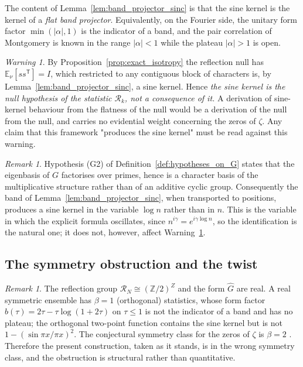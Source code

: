 \documentclass[11pt]{amsart}
\numberwithin{equation}{section}
\theoremstyle{plain}
\theoremstyle{definition}
\theoremstyle{remark}
\newtheorem{remark}[theorem]{Remark}
\newtheorem{warning}[theorem]{Warning}
\begin{document}
The content of Lemma~\ref{lem:band_projector_sinc} is that the sine
kernel is the kernel of a \emph{flat band projector}. Equivalently, on
the Fourier side, the unitary form factor $\min(|\alpha|,1)$ is the
indicator of a band, and the pair correlation of Montgomery
\cite{Montgomery1973} is known in the range $|\alpha| < 1$ while the
plateau $|\alpha| > 1$ is open.

\begin{warning}
\label{warn:sinc_is_the_null}
By Proposition~\ref{prop:exact_isotropy} the reflection null has
$\mathbb{E}_\nu[ss^{\mathsf{T}}] = I$, which restricted to any
contiguous block of characters is, by
Lemma~\ref{lem:band_projector_sinc}, a sine kernel. Hence
\emph{the sine kernel is the null hypothesis of the statistic
$\mathcal{R}_k$, not a consequence of it.} A derivation of sine-kernel
behaviour from the flatness of the null would be a derivation of the
null from the null, and carries no evidential weight concerning the
zeros of $\zeta$. Any claim that this framework "produces the sine
kernel" must be read against this warning.
\end{warning}

\begin{remark}
\label{rem:multiplicative_band}
Hypothesis (G2) of Definition~\ref{def:hypotheses_on_G} states that the
eigenbasis of $G$ factorises over primes, hence is a character basis of
the multiplicative structure rather than of an additive cyclic group.
Consequently the band of Lemma~\ref{lem:band_projector_sinc}, when
transported to positions, produces a sine kernel in the variable
$\log n$ rather than in $n$. This is the variable in which the explicit
formula oscillates, since $n^{i\gamma} = e^{i\gamma \log n}$, so the
identification is the natural one; it does not, however, affect
Warning~\ref{warn:sinc_is_the_null}.
\end{remark}

\subsection{The symmetry obstruction and the twist}
\label{subsec:symmetry_obstruction}

\begin{remark}
\label{rem:symmetry_class_obstruction}
The reflection group $\mathcal{R}_N \cong (\mathbb{Z}/2)^Z$ and the
form $\widehat{G}$ are real. A real symmetric ensemble has
$\beta = 1$ (orthogonal) statistics, whose form factor
$b(\tau) = 2\tau - \tau\log(1+2\tau)$ on $\tau \le 1$
\cite{Mehta2004} is not the indicator of a band and has no plateau;
the orthogonal two-point function contains the sine kernel but is not
$1 - \left(\sin \pi x / \pi x\right)^2$. The conjectural symmetry class
for the zeros of $\zeta$ is $\beta = 2$
\cite{Montgomery1973, Odlyzko1987}. Therefore the present construction,
taken as it stands, is in the wrong symmetry class, and the obstruction
is structural rather than quantitative.
\end{remark}
\end{document}
